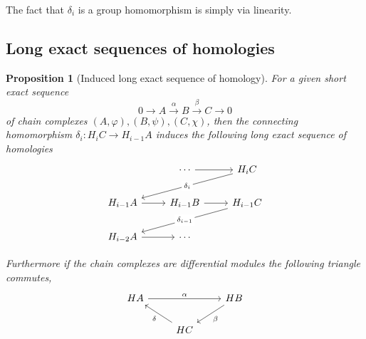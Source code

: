 \documentclass[12pt]{article}
\numberwithin{equation}{section}
\newtheorem{proposition}{Proposition}[section]
\begin{document}
	The fact that $\delta_i $ is a group homomorphism is simply via linearity.

	\subsection{Long exact sequences of homologies}	
	\begin{proposition}[Induced long exact sequence of homology]
		For a given short exact sequence 
		\[ 0 \to A \xrightarrow{\alpha } B \xrightarrow{\beta } C \to 0\]
		of chain complexes $(A, \varphi), (B, \psi), (C, \chi)$, then the connecting homomorphism $\delta_i: H_iC \to H_{i-1}A$ induces the following long exact sequence of homologies
			\[\begin{tikzcd}
				& \cdots & {H_iC} \\
				{H_{i-1}A} & {H_{i-1}B} & {H_{i-1}C} \\
				{H_{i-2}A} & \cdots
				\arrow[from=1-2, to=1-3]
				\arrow[from=2-1, to=2-2]
				\arrow[from=2-2, to=2-3]
				\arrow["{\delta_i}"{description}, from=1-3, to=2-1]
				\arrow["{\delta_{i-1}}"{description}, from=2-3, to=3-1]
				\arrow[from=3-1, to=3-2]
			\end{tikzcd}\]
			
			Furthermore if the chain complexes are differential modules the following triangle commutes,
			\[\begin{tikzcd}
				HA && HB \\
				& HC
				\arrow["\alpha", from=1-1, to=1-3]
				\arrow["\beta", from=1-3, to=2-2]
				\arrow["\delta", from=2-2, to=1-1]
			\end{tikzcd}\]
		
	\end{proposition}
	
\end{document}
